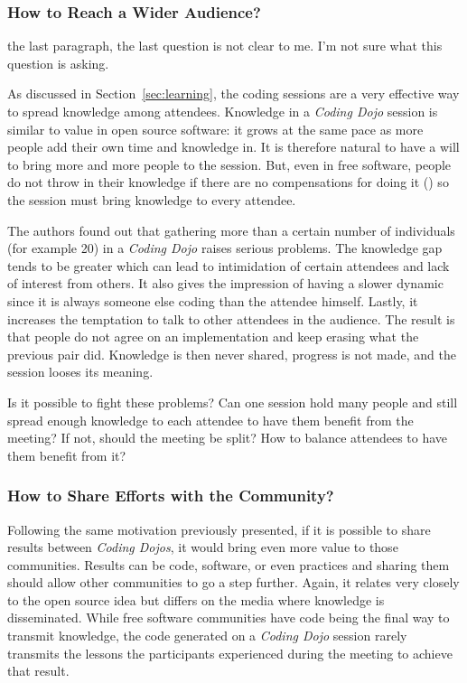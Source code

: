 \subsubsection{How to Reach a Wider Audience?}

{\Large the last paragraph, the last question is not clear to me. I'm
  not sure what this question is asking.}

As discussed in Section~\ref{sec:learning}, the coding sessions
are a very effective way to spread knowledge among attendees. Knowledge in a
\emph{Coding Dojo} session is similar to value in open source
software: it grows at the same pace as more people add their own time
and knowledge in. It is therefore natural to have a will to bring more
and more people to the session. But, even in free software, people do not
throw in their knowledge if there are no compensations for doing it
(\cite{RishabGhosh}) so the session must bring knowledge to every
attendee.

The authors found out that gathering more than a certain number of
individuals (for example 20) in a \emph{Coding Dojo} raises serious
problems. The knowledge gap tends to be greater which can lead to
intimidation of certain attendees and lack of interest from others. It
also gives the impression of having a slower dynamic since it is
always someone else coding than the attendee himself. Lastly, it
increases the temptation to talk to other attendees in the
audience. The result is that people do not agree on an implementation
and keep erasing what the previous pair did. Knowledge is then never
shared, progress is not made, and the session looses its meaning.

Is it possible to fight these problems? Can one session hold many
people and still spread enough knowledge to each attendee to have them
benefit from the meeting? If not, should the meeting be split? How
to balance attendees to have them benefit from it?

\subsubsection{How to Share Efforts with the Community?}

Following the same motivation previously presented, if it is possible
to share results between \emph{Coding Dojos}, it would bring even
more value to those communities. Results can be code, software, or
even practices and sharing them should allow other communities to go a
step further. Again, it relates very closely to the open source
idea but differs on the media where knowledge is disseminated. While
free software communities have code being the final way to transmit
knowledge, the code generated on a \emph{Coding Dojo} session rarely
transmits the lessons the participants experienced during the meeting
to achieve that result.

